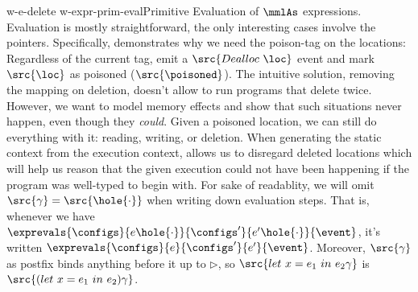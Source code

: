\documentclass[a4paper,names,dvipsnames]{article}
\begin{document}
{{  }{w-e-delete}
}{w-expr-prim-eval}{Primitive Evaluation of $\mmlAs$ expressions.}
Evaluation is mostly straightforward, the only interesting cases involve the pointers.
Specifically,  demonstrates why we need the poison-tag on the locations: Regardless of the current tag, emit a $\src{Dealloc\ \loc}$ event and mark $\src{\loc}$ as poisoned ($\src{\poisoned}$).
The intuitive solution, removing the mapping on deletion, doesn't allow to run programs that delete twice.
However, we want to model memory effects and show that such situations never happen, even though they {\em could}.
Given a poisoned location, we can still do everything with it: reading, writing, or deletion.
When generating the static context from the execution context,  allows us to disregard deleted locations which will help us reason that the given execution could not have been happening if the program was well-typed to begin with.
For sake of readablity, we will omit $\src{\gamma}=\src{\hole{\cdot}}$ when writing down evaluation steps.
That is, whenever we have $\exprevals{\configs}{e\hole{\cdot}}{\configs'}{e'\hole{\cdot}}{\event}$, it's written $\exprevals{\configs}{e}{\configs'}{e'}{\event}$.
Moreover, $\src{\gamma}$ as postfix binds anything before it up to $\triangleright$, so $\src{let\ x=e_{1}\ in\ e_{2}\gamma}$ is $\src{(let\ x=e_{1}\ in\ e_{2})\gamma}$.
\end{document}

